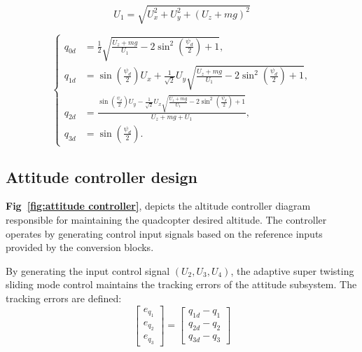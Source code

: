 \begin{small}
\begin{enumerate}
\begin{equation}
U_1 = \sqrt{U_x^2 + U_y^2 + (U_z + mg)^2}
\label{eq:35}
\end{equation}

\begin{equation}
\left\{
\begin{aligned}
q_{0d} &= \tfrac{1}{2} \sqrt{\frac{U_z + mg}{U_1} - 2\sin^2\!\left(\tfrac{\psi_d}{2}\right) + 1}, \\[8pt]
q_{1d} &= \sin\!\left(\tfrac{\psi_d}{2}\right) U_x 
+ \tfrac{1}{\sqrt{2}} U_y \sqrt{\frac{U_z + mg}{U_1} - 2\sin^2\!\left(\tfrac{\psi_d}{2}\right) + 1}, \\[8pt]
q_{2d} &= \frac{ \sin\!\left(\tfrac{\psi_d}{2}\right) U_y 
- \tfrac{1}{\sqrt{2}} U_x \sqrt{\frac{U_z + mg}{U_1} - 2\sin^2\!\left(\tfrac{\psi_d}{2}\right) + 1} }
{U_z + mg + U_1}, \\[8pt]
q_{3d} &= \sin\!\left(\tfrac{\psi_d}{2}\right).
\end{aligned}
\right.
\label{eq:36}
\end{equation}

\subsection{Attitude controller design}
\noindent
\textbf{Fig~\ref{fig:attitude controller}}, depicts the altitude controller diagram responsible for maintaining the quadcopter desired altitude. The controller operates by generating control input signals based on the reference inputs provided by the conversion blocks.

By generating the input control signal $(U_2, U_3, U_4)$, the adaptive super twisting sliding 
mode control maintains the tracking errors of the attitude subsystem. 
The tracking errors are defined:
\begin{equation}
\begin{bmatrix}
e_{q_1} \\[6pt]
e_{q_2} \\[6pt]
e_{q_3}
\end{bmatrix}
=
\begin{bmatrix}
q_{1d} - q_1 \\[6pt]
q_{2d} - q_2 \\[6pt]
q_{3d} - q_3
\end{bmatrix}
\label{eq:attitude for error}
\end{equation}


\end{enumerate}
\end{small}
